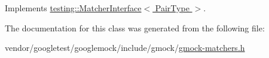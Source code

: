 Implements \hyperlink{classtesting_1_1_matcher_interface_a296b43607cd99d60365f0e6a762777cf}{testing\+::\+Matcher\+Interface$<$ Pair\+Type $>$}.



The documentation for this class was generated from the following file\+:\begin{DoxyCompactItemize}
\item 
vendor/googletest/googlemock/include/gmock/\hyperlink{gmock-matchers_8h}{gmock-\/matchers.\+h}\end{DoxyCompactItemize}
